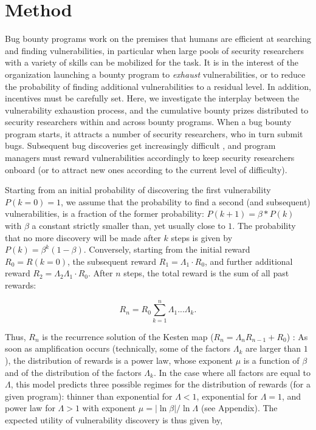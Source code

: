 \section{Method}
\label{sec:method}
Bug bounty programs work on the premises that humans are efficient at searching and finding vulnerabilities, in particular when large pools of security researchers with a variety of skills can be mobilized for the task. It is in the interest of the organization launching a bounty program to {\it exhaust} vulnerabilities, or to reduce the probability of finding additional vulnerabilities to a residual level. In addition, incentives must be carefully set. Here, we investigate the interplay between the vulnerability exhaustion process, and the cumulative bounty prizes distributed to security researchers within and across bounty programs. When a bug bounty program starts, it attracts a number of security researchers, who in turn submit bugs. Subsequent bug discoveries get increasingly difficult \cite{brady1999murphy}, and program managers must reward vulnerabilities accordingly to keep security researchers onboard (or to attract new ones according to the current level of difficulty). %

Starting from an initial probability of discovering the first vulnerability $P(k=0) = 1$, we assume that the probability to find a second (and subsequent) vulnerabilities, is a fraction of the former probability: $P(k+1) = \beta * P(k)$ with $\beta$ a constant strictly smaller than, yet usually close to $1$. 
The probability that no more discovery will be made after $k$ steps is given by $P(k) = \beta^{k} (1-\beta)$. Conversely, starting from the initial reward $R_0 = R(k=0)$, the subsequent reward $R_1 = \Lambda_1 \cdot R_0$, and further additional reward $ R_2 = \Lambda_2 \Lambda_1 \cdot R_{0}$. After $n$ steps, the total reward is the sum of all past rewards: 

\begin{equation}
R_{n} = R_{0} \sum_{k=1}^{n} \Lambda_1 ... \Lambda_k.
\end{equation}

Thus, $R_{n}$ is the recurrence solution of the 
Kesten map ($R_{n} = \Lambda_n R_{n-1} +R_0$)
\cite{kesten1973random,sornette1997convergent}:  As soon as amplification occurs (technically, 
some of the factors $\Lambda_k$ are larger than $1$), the distribution
of rewards is a power law, whose exponent $\mu$ is a function of $\beta$
and of the distribution of the factors $\Lambda_k$. In the case where
all factors are equal to $\Lambda$, this model predicts three possible regimes for the distribution of rewards (for a given program): thinner than exponential for $\Lambda < 1$, exponential for $\Lambda = 1$, and power law for $\Lambda > 1$ with exponent $\mu = |\ln \beta|/ \ln \Lambda$ (see Appendix). The expected utility of vulnerability discovery is thus given by,

